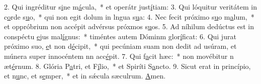 2. Qui ingréditur s\uline{i}ne m\uline{á}cula,~* et operátr just\uline{í}tiam:
3. Qui lóquitur veritátem in c\uline{o}rde s\uline{u}o,~* qui non egit dolum in lngua s\uline{u}a:
4. Nec fecit próximo s\uline{u}o m\uline{a}lum,~* et oppróbrium non accépit advérsus próxmos s\uline{u}os.
5. Ad níhilum dedúctus est in conspéctu \uline{e}jus mal\uline{í}gnus:~* timéntes autem Dóminm glor\uline{í}ficat:
6. Qui jurat próximo suo, \uline{e}t non d\uline{é}cipit,~* qui pecúniam suam non dedit ad usúram, et múnera super innocéntem nn acc\uline{é}pit.
7. Qui f\uline{a}cit hæc:~* non movébitur n æt\uline{é}rnum.
8. Glória P\uline{a}tri, et F\uline{í}lio,~* et Spiríti S\uline{a}ncto.
9. Sicut erat in princípio, et n\uline{u}nc, et s\uline{e}mper,~* et in sǽcula sæculrum. \uline{A}men.
